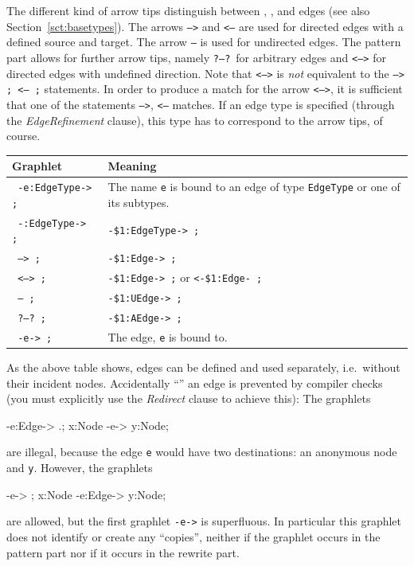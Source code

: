 The different kind of arrow tips distinguish between , , and  edges (see also Section~\ref{sct:basetypes}).
The arrows \texttt{-->} and \texttt{<--} are used for directed edges with a defined source and target.
The arrow \texttt{--} is used for undirected edges.
The pattern part allows for further arrow tips, namely \texttt{?--?}\ for arbitrary edges and \texttt{<-->} for directed edges with undefined direction.
Note that \texttt{<-->} is \emph{not} equivalent to the \texttt{--> ; <-- ;} statements.
In order to produce a match for the arrow \texttt{<-->}, it is sufficient that one of the statements \texttt{-->}, \texttt{<--} matches.
If an edge type is specified (through the \emph{EdgeRefinement} clause), this type has to correspond to the arrow tips, of course.
\begin{center}
	\begin{tabularx}{\linewidth}{lX}
		\textbf{Graphlet} & \textbf{Meaning}\\ \hline
		\texttt{ -e:EdgeType-> ;} & The name \texttt{e} is bound to an edge of type \texttt{EdgeType} or one of its subtypes. \\
		\texttt{ -:EdgeType-> ;} & \texttt{-\$1:EdgeType-> ;} \\
		\texttt{ --> ;} & \texttt{-\$1:Edge-> ;} \\
		\texttt{ <--> ;} & \texttt{-\$1:Edge-> ;} or  \texttt{<-\$1:Edge- ;}\\
		\texttt{ -- ;} & \texttt{-\$1:UEdge-> ;} \\
		\texttt{ ?--?\ ;} & \texttt{-\$1:AEdge-> ;} \\
		\texttt{ -e-> ;} & The edge, \texttt{e} is bound to.
	\end{tabularx}
\end{center}
As the above table shows, edges can be defined and used separately, i.e.\ without their incident nodes.
Accidentally ``'' an edge is prevented by compiler checks (you must explicitly use the \emph{Redirect} clause to achieve this):
The graphlets
\begin{grgenlet}
-e:Edge-> .;
x:Node -e-> y:Node;
\end{grgenlet}
are illegal, because the edge \texttt{e} would have two destinations: an anonymous node and \texttt{y}.
However, the graphlets
\begin{grgenlet}
-e-> ;
x:Node -e:Edge-> y:Node;
\end{grgenlet}
are allowed, but the first graphlet \texttt{-e->} is superfluous. In particular this graphlet does not identify or create any ``copies'', neither if the graphlet occurs in the pattern part nor if it occurs in the rewrite part.
